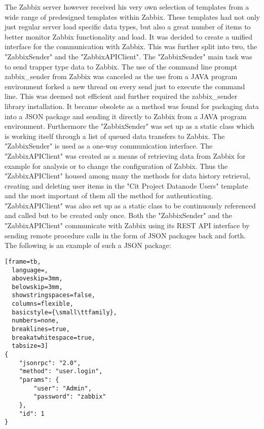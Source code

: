 	The Zabbix server however received his very own selection of templates from a wide range of predesigned templates within Zabbix. These templates had not only just regular server load specific data types, but also a great number of items to better monitor Zabbix functionality and load.
	It was decided to create a unified interface for the communication with Zabbix. This was further split into two, the "ZabbixSender" and the "ZabbixAPIClient". The "ZabbixSender" main task was to send trapper type data to Zabbix. The use of the command line prompt zabbix\_sender from Zabbix was canceled as the use from a JAVA program environment forked a new thread on every send just to execute the command line. This was deemed not efficient and further required the zabbix\_sender library installation. It became obsolete as a method was found for packaging data into a JSON package and sending it directly to Zabbix from a JAVA program environment. Furthermore the "ZabbixSender" was set up as a static class which is working itself through a list of queued data transfers to Zabbix. The "ZabbixSender" is used as a one-way communication interface. The "ZabbixAPIClient" was created as a means of retrieving data from Zabbix for example for analysis or to change the configuration of Zabbix. Thus the "ZabbixAPIClient" housed among many the methods for data history retrieval, creating and deleting user items in the "Cit Project Datanode Users" template and the most important of them all the method for authenticating. "ZabbixAPIClient" was also set up as a static class to be continuously referenced and called but to be created only once. Both the "ZabbixSender" and the "ZabbixAPIClient" communicate with Zabbix using its REST API interface by sending remote procedure calls in the form of JSON packages back and forth.
The following is an example of such a JSON package\cite{zab3}:
\begin{lstlisting}[frame=tb,
  language=,
  aboveskip=3mm,
  belowskip=3mm,
  showstringspaces=false,
  columns=flexible,
  basicstyle={\small\ttfamily},
  numbers=none,
  breaklines=true,
  breakatwhitespace=true,
  tabsize=3]
{
    "jsonrpc": "2.0",
    "method": "user.login",
    "params": {
        "user": "Admin",
        "password": "zabbix"
    },
    "id": 1
}\end{lstlisting} 

